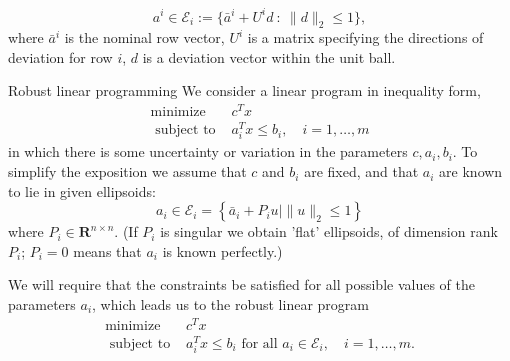 \begin{equation}
a^i \in \mathcal E_i := \{\bar a^i + U^id \ : \  \|d\|_2 \leq 1\},
\end{equation}
where \(\bar a^i\) is the nominal row vector, \(U^i\) is a matrix specifying the directions of deviation for row \(i\), \(d\) is a deviation vector within the unit ball. 

\begin{center}
\end{center}

Robust linear programming
We consider a linear program in inequality form,
$$
\begin{array}{ll}
\operatorname{minimize} & c^T x \\
\text { subject to } & a_i^T x \leq b_i, \quad i=1, \ldots, m
\end{array}
$$
in which there is some uncertainty or variation in the parameters $c, a_i, b_i$. To simplify the exposition we assume that $c$ and $b_i$ are fixed, and that $a_i$ are known to lie in given ellipsoids:
$$
a_i \in \mathcal{E}_i=\left\{\bar{a}_i+P_i u \mid\|u\|_2 \leq 1\right\}
$$
where $P_i \in \mathbf{R}^{n \times n}$. (If $P_i$ is singular we obtain 'flat' ellipsoids, of dimension rank $P_i$; $P_i=0$ means that $a_i$ is known perfectly.)

We will require that the constraints be satisfied for all possible values of the parameters $a_i$, which leads us to the robust linear program
$$
\begin{array}{ll}
\operatorname{minimize} & c^T x \\
\text { subject to } & a_i^T x \leq b_i \text { for all } a_i \in \mathcal{E}_i, \quad i=1, \ldots, m .
\end{array}
$$

